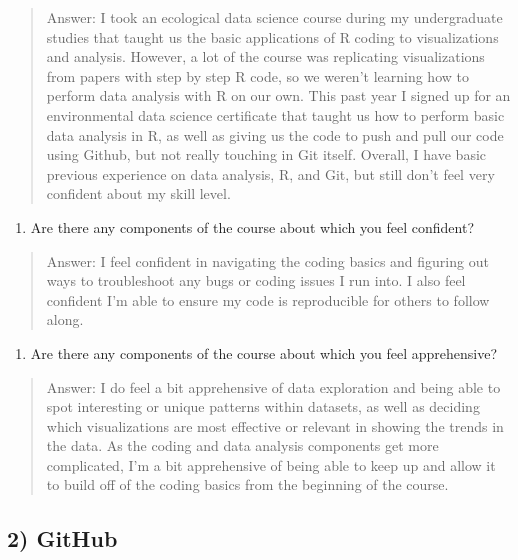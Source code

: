 \documentclass[
]{article}
\providecommand{\tightlist}{%
  \setlength{\itemsep}{0pt}\setlength{\parskip}{0pt}}
\begin{document}
\begin{quote}
Answer: I took an ecological data science course during my undergraduate
studies that taught us the basic applications of R coding to
visualizations and analysis. However, a lot of the course was
replicating visualizations from papers with step by step R code, so we
weren't learning how to perform data analysis with R on our own. This
past year I signed up for an environmental data science certificate that
taught us how to perform basic data analysis in R, as well as giving us
the code to push and pull our code using Github, but not really touching
in Git itself. Overall, I have basic previous experience on data
analysis, R, and Git, but still don't feel very confident about my skill
level.
\end{quote}

\begin{enumerate}
\def\labelenumi{\arabic{enumi}.}
\setcounter{enumi}{1}
\tightlist
\item
  Are there any components of the course about which you feel confident?
\end{enumerate}

\begin{quote}
Answer: I feel confident in navigating the coding basics and figuring
out ways to troubleshoot any bugs or coding issues I run into. I also
feel confident I'm able to ensure my code is reproducible for others to
follow along.
\end{quote}

\begin{enumerate}
\def\labelenumi{\arabic{enumi}.}
\setcounter{enumi}{2}
\tightlist
\item
  Are there any components of the course about which you feel
  apprehensive?
\end{enumerate}

\begin{quote}
Answer: I do feel a bit apprehensive of data exploration and being able
to spot interesting or unique patterns within datasets, as well as
deciding which visualizations are most effective or relevant in showing
the trends in the data. As the coding and data analysis components get
more complicated, I'm a bit apprehensive of being able to keep up and
allow it to build off of the coding basics from the beginning of the
course.
\end{quote}

\subsection{2) GitHub}\label{github}
\end{document}

